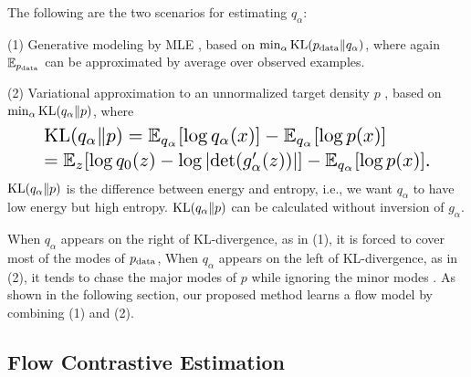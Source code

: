 \documentclass[10pt,twocolumn,letterpaper]{article}
\newcommand{\E}{\mathbb{E}}
\newcommand{\KL}{{\rm KL}}
\begin{document}
The following are the two scenarios for estimating $q_\alpha$:

(1) Generative modeling by MLE \cite{dinh2014nice,dinh2016density, kingma2018Glow,grathwohl2018ffjord,behrmann2018invertible, kumar2019videoflow, tran2019discrete}, based on $\min_\alpha {\rm KL}(p_{\rm data} \| q_\alpha)$, where again $\E_{p_{\rm data}}$ can be approximated by average over observed examples. 

(2) Variational approximation to an unnormalized target density $p$ \cite{kingma2013auto,rezende2015variational, kingma2016improved,kingma2014efficient, khemakhem2019variational}, based on $\min_\alpha {\rm KL}(q_\alpha\|p)$, where 
\begin{equation}
\begin{split} 
	& \resizebox{.78\linewidth}{!}{$\KL (q_\alpha\|p) = \E_{q_\alpha}[\log q_\alpha(x)] - \E_{q_\alpha}[\log p(x)]$}\\
    & \resizebox{.88\linewidth}{!}{$= \E_{z} [\log q_0(z) - \log |{\rm det}(g_\alpha'(z))|] - \E_{q_\alpha}[\log p(x)]. $} 
\end{split}
\end{equation} 
${\rm KL}(q_\alpha\|p)$ is the difference between energy and entropy, i.e., we want $q_\alpha$ to have low energy but high entropy. ${\rm KL}(q_\alpha\|p)$ can be calculated without inversion of $g_\alpha$. 

When $q_\alpha$ appears on the right of KL-divergence, as in (1), it is forced to cover most of the modes of $p_{\rm data}$, When $q_\alpha$ appears on the left of KL-divergence, as in (2), it tends to chase the major modes of $p$ while ignoring the minor modes \cite{murphy2012machine,fox2012tutorial}. As shown in the following section, our proposed method learns a flow model by combining (1) and (2). 

\subsection{Flow Contrastive Estimation}
\end{document}
